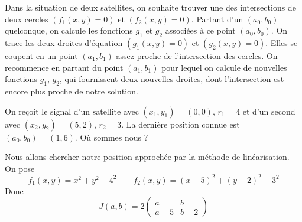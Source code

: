 \documentclass[class=report,crop=false]{standalone}
\begin{document}
Dans la situation de deux satellites, on souhaite trouver une des intersections
de deux cercles $(f_1(x,y)=0)$ et $(f_2(x,y)=0)$. Partant d'un $(a_0,b_0)$
quelconque, on calcule les fonctions $g_1$ et $g_2$ associées à ce point $(a_0,b_0)$.
On trace les deux droites d'équation $(g_1(x,y)=0)$ et $(g_2(x,y)=0)$.
Elles se coupent en un point $(a_1,b_1)$ assez proche de l'intersection des cercles.
On recommence en partant du point $(a_1,b_1)$ pour lequel on calcule de
nouvelles fonctions $g_1$, $g_2$, qui fournissent deux nouvelles droites, dont l'intersection
est encore plus proche de notre solution.



\begin{exemple}
On reçoit le signal d'un satellite avec $(x_1,y_1)=(0,0)$, $r_1=4$
et d'un second avec $(x_2,y_2)=(5,2)$, $r_2=3$.
La dernière position connue est $(a_0,b_0)=(1,6)$. Où sommes nous ?

Nous allons chercher notre position approchée par la méthode de linéarisation.
On pose 
$$f_1(x,y) = x^2+y^2-4^2 \qquad f_2(x,y) = (x-5)^2+(y-2)^2-3^2$$
Donc
$$J(a,b) = 2 \begin{pmatrix}a&b\\a-5&b-2\end{pmatrix}$$


\end{exemple}
\end{document}
